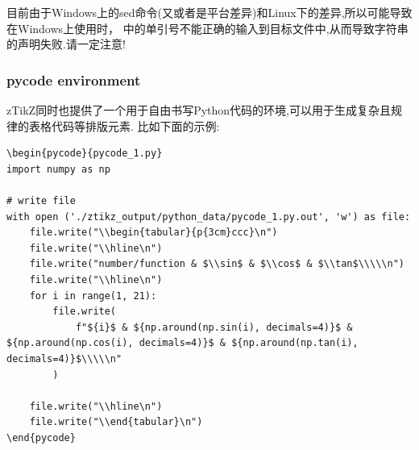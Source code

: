 \documentclass[
  hyper,    
  lang=cn,
  class=book,
  bib_index={load},
  mathSpec={envStyle=leftbar, alias},
  toc={column=2, title=目录},
]{zlatex}
\let\cmd\ztexverb
\begin{document}
\begin{remark}
目前由于Windows上的sed命令(又或者是平台差异)和Linux下的差异,所以可能导致在Windows上使用时，
\cmd{\py}中的单引号\cmd{'}不能正确的输入到目标文件中,从而导致字符串的声明失败.请一定注意!
\end{remark}


\subsubsection{pycode environment}
zTikZ同时也提供了一个用于自由书写Python代码的环境\cmd{pycode},可以用于生成复杂且规律的表格代码等排版元素.
比如下面的示例:
\begin{verbatim}
\begin{pycode}{pycode_1.py}
import numpy as np

# write file
with open ('./ztikz_output/python_data/pycode_1.py.out', 'w') as file:
    file.write("\\begin{tabular}{p{3cm}ccc}\n")
    file.write("\\hline\n")
    file.write("number/function & $\\sin$ & $\\cos$ & $\\tan$\\\\\n")
    file.write("\\hline\n")
    for i in range(1, 21):
        file.write(
            f"${i}$ & ${np.around(np.sin(i), decimals=4)}$ &  ${np.around(np.cos(i), decimals=4)}$ & ${np.around(np.tan(i), decimals=4)}$\\\\\n"
        )

    file.write("\\hline\n")
    file.write("\\end{tabular}\n")
\end{pycode}
\end{verbatim}
\end{document}
